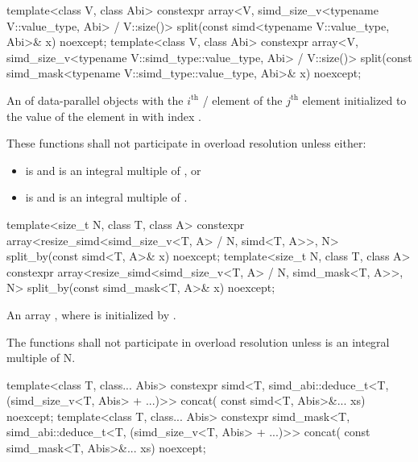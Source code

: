 \begin{itemdecl}
template<class V, class Abi>
  constexpr array<V, simd_size_v<typename V::value_type, Abi> / V::size()>
    split(const simd<typename V::value_type, Abi>& x) noexcept;
template<class V, class Abi>
  constexpr array<V, simd_size_v<typename V::simd_type::value_type, Abi> / V::size()>
    split(const simd_mask<typename V::simd_type::value_type, Abi>& x) noexcept;
\end{itemdecl}

\begin{itemdescr}
  \pnum\returns
  An  of data-parallel objects with the $i^\text{th}$ / element of the $j^\text{th}$  element initialized to the value of the element in  with index .

  \pnum\remarks
  These functions shall not participate in overload resolution unless either:
  \begin{itemize}
    \item {} is  and  is an integral multiple of , or
    \item {} is  and  is an integral multiple of .
  \end{itemize}
\end{itemdescr}

\begin{itemdecl}
template<size_t N, class T, class A>
  constexpr array<resize_simd<simd_size_v<T, A> / N, simd<T, A>>, N>
    split_by(const simd<T, A>& x) noexcept;
template<size_t N, class T, class A>
  constexpr array<resize_simd<simd_size_v<T, A> / N, simd_mask<T, A>>, N>
    split_by(const simd_mask<T, A>& x) noexcept;
\end{itemdecl}

\begin{itemdescr}
  \pnum\returns
  An array , where  is initialized by .

  \pnum\remarks
  The functions shall not participate in overload resolution unless  is an integral multiple of \tcode N.
\end{itemdescr}

\begin{itemdecl}
template<class T, class... Abis>
  constexpr simd<T, simd_abi::deduce_t<T, (simd_size_v<T, Abis> + ...)>> concat(
    const simd<T, Abis>&... xs) noexcept;
template<class T, class... Abis>
  constexpr simd_mask<T, simd_abi::deduce_t<T, (simd_size_v<T, Abis> + ...)>> concat(
    const simd_mask<T, Abis>&... xs) noexcept;
\end{itemdecl}

